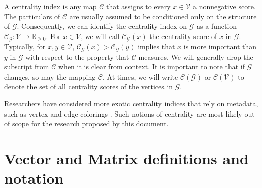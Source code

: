\documentclass[10]{report}
\begin{document}
A centrality index is any map $\mathcal{C}$ that assigns to every $x \in \mathcal{V}$ a nonnegative score.
The particulars of $\mathcal{C}$ are usually assumed to be conditioned only on the structure of $\mathcal{G}$.
Consequently, we can identify the centrality index on $\mathcal{G}$ as a function $\mathcal{C}_\mathcal{G} : \mathcal{V} \rightarrow \mathbb{R}_{\geq 0}$.
For $x \in \mathcal{V}$, we will call $\mathcal{C}_\mathcal{G}(x)$ the centrality score of $x$ in $\mathcal{G}$. 
Typically, for $x,y \in \mathcal{V}$, $\mathcal{C}_\mathcal{G}(x) > \mathcal{C}_\mathcal{G}(y)$ implies that $x$ is more important than $y$ in $\mathcal{G}$ with respect to the property that $\mathcal{C}$ measures. 
We will generally drop the subscript from $\mathcal{C}$ when it is clear from context. 
It is important to note that if $\mathcal{G}$ changes, so may the mapping $\mathcal{C}$. 
At times, we will write $\mathcal{C}(\mathcal{G})$ or $\mathcal{C}(\mathcal{V})$ to denote the set of all centrality scores of the vertices in $\mathcal{G}$. 

Researchers have considered more exotic centrality indices that rely on metadata, such as vertex and edge colorings \cite{kang2016diffusion}.
Such notions of centrality are most likely out of scope for the research proposed by this document. 


\section{Vector and Matrix definitions and notation} \label{sec:matdef}
\end{document}
